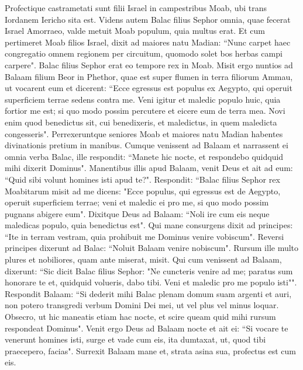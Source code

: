 \begin{biblechapter}  
\verse Profectique castrametati sunt filii Israel in campestribus Moab, ubi trans Iordanem Iericho sita est. 
\verse Videns autem Balac filius Sephor omnia, quae fecerat Israel Amorraeo, 
\verse valde metuit Moab populum, quia multus erat. Et cum pertimeret Moab filios Israel, 
\verse dixit ad maiores natu Madian: “Nunc carpet haec congregatio omnem regionem per circuitum, quomodo solet bos herbas campi carpere". Balac filius Sephor erat eo tempore rex in Moab. 
\verse Misit ergo nuntios ad Balaam filium Beor in Phethor, quae est super flumen in terra filiorum Ammau, ut vocarent eum et dicerent: “Ecce egressus est populus ex Aegypto, qui operuit superficiem terrae sedens contra me. 
\verse Veni igitur et maledic populo huic, quia fortior me est; si quo modo possim percutere et eicere eum de terra mea. Novi enim quod benedictus sit, cui benedixeris, et maledictus, in quem maledicta congesseris". 
\verse Perrexeruntque seniores Moab et maiores natu Madian habentes divinationis pretium in manibus. Cumque venissent ad Balaam et narrassent ei omnia verba Balac, 
\verse ille respondit: “Manete hic nocte, et respondebo quidquid mihi dixerit Dominus". Manentibus illis apud Balaam, 
\verse venit Deus et ait ad eum: “Quid sibi volunt homines isti apud te?". 
\verse Respondit: “Balac filius Sephor rex Moabitarum misit ad me 
\verse dicens: "Ecce populus, qui egressus est de Aegypto, operuit superficiem terrae; veni et maledic ei pro me, si quo modo possim pugnans abigere eum". 
\verse Dixitque Deus ad Balaam: “Noli ire cum eis neque maledicas populo, quia benedictus est". 
\verse Qui mane consurgens dixit ad principes: “Ite in terram vestram, quia prohibuit me Dominus venire vobiscum". 
\verse Reversi principes dixerunt ad Balac: “Noluit Balaam venire nobiscum". 
\verse Rursum ille multo plures et nobiliores, quam ante miserat, misit. 
\verse Qui cum venissent ad Balaam, dixerunt: “Sic dicit Balac filius Sephor: "Ne cuncteris venire ad me; 
\verse paratus sum honorare te et, quidquid volueris, dabo tibi. Veni et maledic pro me populo isti"". 
\verse Respondit Balaam: “Si dederit mihi Balac plenam domum suam argenti et auri, non potero transgredi verbum Domini Dei mei, ut vel plus vel minus loquar. 
\verse Obsecro, ut hic maneatis etiam hac nocte, et scire queam quid mihi rursum respondeat Dominus".  
\verse Venit ergo Deus ad Balaam nocte et ait ei: “Si vocare te venerunt homines isti, surge et vade cum eis, ita dumtaxat, ut, quod tibi praecepero, facias". 
\verse Surrexit Balaam mane et, strata asina sua, profectus est cum eis. 

\end{biblechapter}
